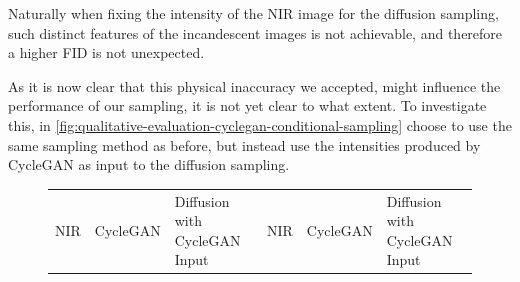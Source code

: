 Naturally when fixing the intensity of the NIR image for the diffusion sampling, such distinct features of the incandescent images is not achievable,
and therefore a higher FID is not unexpected.

As it is now clear that this physical inaccuracy we accepted, might influence the performance of our sampling, it is not yet clear to what extent.
To investigate this, in \autoref{fig:qualitative-evaluation-cyclegan-conditional-sampling} choose to use the same sampling method as before, but instead use the intensities produced by CycleGAN as input to the diffusion sampling.

\begin{figure}[htp!]
    \centering
    \begin{tabularx}{\textwidth}{Y Y Y !{\space} Y Y Y}
        NIR                                                                              & CycleGAN                                                                                   & Diffusion with CycleGAN Input                                                                    & NIR                                                                              & CycleGAN                                                                                   & Diffusion with CycleGAN Input                                                                    \\

\end{tabularx}
\end{figure}
